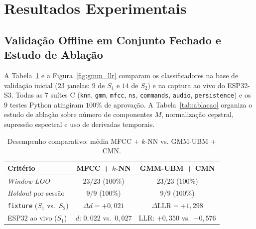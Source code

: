 \documentclass[9pt,technote,a4paper]{IEEEtran}
\begin{document}
\section{Resultados Experimentais}
\label{sec:resultados}

\subsection{Validação Offline em Conjunto Fechado e Estudo de Ablação}
A Tabela~\ref{tab:comparacao} e a Figura~\ref{fig:gmm_llr} comparam os classificadores na base de validação inicial ($23$ janelas: $9$ de $S_1$ e $14$ de $S_2$) e na captura ao vivo do ESP32-S3. Todas as $7$ suítes C (\texttt{knn}, \texttt{gmm}, \texttt{mfcc}, \texttt{ns}, \texttt{commands}, \texttt{audio}, \texttt{persistence}) e os $9$ testes Python atingiram $100\%$ de aprovação. A Tabela~\ref{tab:ablacao} organiza o estudo de ablação sobre número de componentes $M$, normalização cepstral, supressão espectral e uso de derivadas temporais.

\begin{table}[t]
\centering
\footnotesize
\setlength{\tabcolsep}{3.5pt}
\caption{Desempenho comparativo: média MFCC + $k$-NN vs. GMM-UBM + CMN.}
\label{tab:comparacao}
\begin{tabular}{lcc}
\toprule
\textbf{Critério} & \textbf{MFCC + $k$-NN} & \textbf{GMM-UBM + CMN} \\
\midrule
\textit{Window-LOO} & $23/23$ ($100\%$) & $23/23$ ($100\%$) \\
\textit{Holdout} por sessão & $9/9$ ($100\%$) & $9/9$ ($100\%$) \\
\texttt{fixture} ($S_1$ vs.\ $S_2$) & $\Delta d = +0{,}021$ & $\Delta \mathrm{LLR} = +1{,}298$ \\
ESP32 ao vivo ($S_1$) & $d$: $0{,}022$ vs.\ $0{,}027$ & $\mathrm{LLR}$: $+0{,}350$ vs.\ $-0{,}576$ \\
\bottomrule
\end{tabular}
\end{table}
\end{document}
